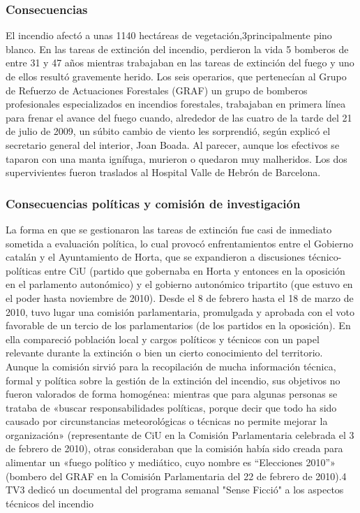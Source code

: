 \subsubsection{Consecuencias}
El incendio afectó a unas 1140 hectáreas de vegetación,3​ principalmente pino blanco. En las tareas de extinción del incendio, perdieron la vida 5 bomberos de entre 31 y 47 años mientras trabajaban en las tareas de extinción del fuego y uno de ellos resultó gravemente herido. Los seis operarios, que pertenecían al Grupo de Refuerzo de Actuaciones Forestales (GRAF) un grupo de bomberos profesionales especializados en incendios forestales, trabajaban en primera línea para frenar el avance del fuego cuando, alrededor de las cuatro de la tarde del 21 de julio de 2009, un súbito cambio de viento les sorprendió, según explicó el secretario general del interior, Joan Boada. Al parecer, aunque los efectivos se taparon con una manta ignífuga, murieron o quedaron muy malheridos. Los dos supervivientes fueron traslados al Hospital Valle de Hebrón de Barcelona.
\subsubsection{Consecuencias políticas y comisión de investigación}
La forma en que se gestionaron las tareas de extinción fue casi de inmediato sometida a evaluación política, lo cual provocó enfrentamientos entre el Gobierno catalán y el Ayuntamiento de Horta, que se expandieron a discusiones técnico-políticas entre CiU (partido que gobernaba en Horta y entonces en la oposición en el parlamento autonómico) y el gobierno autonómico tripartito (que estuvo en el poder hasta noviembre de 2010). Desde el 8 de febrero hasta el 18 de marzo de 2010, tuvo lugar una comisión parlamentaria, promulgada y aprobada con el voto favorable de un tercio de los parlamentarios (de los partidos en la oposición). En ella compareció población local y cargos políticos y técnicos con un papel relevante durante la extinción o bien un cierto conocimiento del territorio. Aunque la comisión sirvió para la recopilación de mucha información técnica, formal y política sobre la gestión de la extinción del incendio, sus objetivos no fueron valorados de forma homogénea: mientras que para algunas personas se trataba de «buscar responsabilidades políticas, porque decir que todo ha sido causado por circunstancias meteorológicas o técnicas no permite mejorar la organización» (representante de CiU en la Comisión Parlamentaria celebrada el 3 de febrero de 2010), otras consideraban que la comisión había sido creada para alimentar un «fuego político y mediático, cuyo nombre es “Elecciones 2010”» (bombero del GRAF en la Comisión Parlamentaria del 22 de febrero de 2010).4​ TV3 dedicó un documental del programa semanal "Sense Ficció" a los aspectos técnicos del incendio
